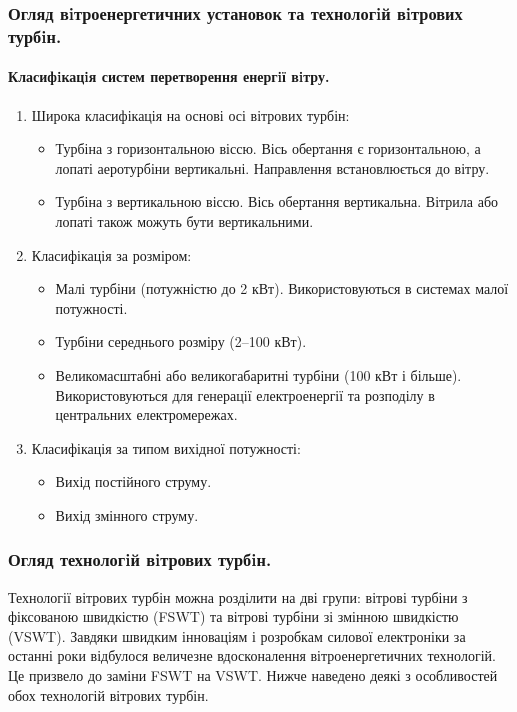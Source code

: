 \documentclass{beamer}
\begin{document}
    \begin{frame}
        \frametitle{Огляд вiтроенергетичних установок та технологiй вiтрових турбiн.}
        \framesubtitle{Класифiкацiя систем перетворення енергiї вiтру.}
        \begin{enumerate}
            \item Широка класифікація на основі осі вітрових турбін:
            \begin{itemize}
                \item Турбіна з горизонтальною віссю. Вісь обертання є горизонтальною, а лопаті аеротурбіни вертикальні. Направлення встановлюється до вітру.
                \item Турбіна з вертикальною віссю. Вісь обертання вертикальна. Вітрила або лопаті також можуть бути вертикальними.
            \end{itemize}
            \item Класифікація за розміром:
            \begin{itemize}
                \item Малі турбіни (потужністю до 2 кВт). Використовуються в системах малої потужності.
                \item Турбіни середнього розміру (2–100 кВт).
                \item Великомасштабні або великогабаритні турбіни (100 кВт і більше). Використовуються для генерації електроенергії та розподілу в центральних електромережах.
            \end{itemize}
            \item Класифікація за типом вихідної потужності:
            \begin{itemize}
                \item Вихід постійного струму.
                \item Вихід змінного струму.
            \end{itemize}
        \end{enumerate}
    \end{frame}

    \begin{frame}
        \frametitle{Огляд технологiй вiтрових турбiн.}
        Технології вітрових турбін можна розділити на дві групи: вітрові турбіни з фіксованою швидкістю (FSWT) та вітрові турбіни зі змінною швидкістю (VSWT). 
        Завдяки швидким інноваціям і розробкам силової електроніки за останні роки відбулося величезне вдосконалення вітроенергетичних технологій. 
        Це призвело до заміни FSWT на VSWT. Нижче наведено деякі з особливостей обох технологій вітрових турбін.
    \end{frame}
\end{document}
